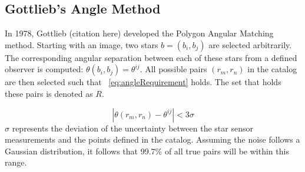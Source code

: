 \begin{figure}
\end{figure}


\subsection{Gottlieb's Angle Method}\label{subsec:gottlieb'sAngleMethod}
In 1978, Gottlieb (citation here) developed the Polygon Angular Matching method.
Starting with an image, two stars $b = (b_i, b_j)$ are selected arbitrarily.
The corresponding angular separation between each of these stars from a defined observer is computed:
$\theta (b_i, b_j) = \theta^{ij}$.
All possible pairs $(r_m, r_n)$ in the catalog are then selected such that ~\autoref{eq:angleRequirement} holds.
The set that holds these pairs is denoted as $R$.

\begin{equation}
    \label{eq:angleRequirement}
    | \theta(r_m, r_n) - \theta^{ij} | < 3 \sigma
\end{equation}
$\sigma$ represents the deviation of the uncertainty between the star sensor measurements and the points defined in the
catalog.
Assuming the noise follows a Gaussian distribution, it follows that 99.7\% of all true pairs will be within this range.

